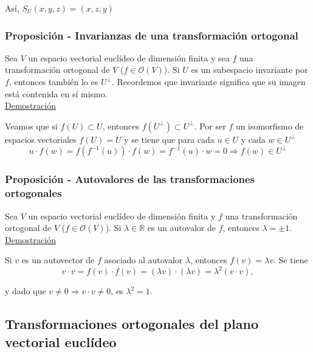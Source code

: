 \documentclass[12pt, a4paper, ones, notitlepage, openany,titlepage]{article}
\newcommand{\demostracion}{\noindent\underline{Demostración}}
\begin{document}
\noindent Así, $S_{U}(x, y, z)=(x, z, y)$

\subsubsection{Proposición - Invarianzas de una transformación ortogonal}
Sea $V$ un espacio vectorial euclídeo de dimensión finita y sea $f$ una transformación ortogonal de $V$ ($f \in \mathcal{O}(V)$). Si $U$ es un subespacio invariante por $f$, entonces también lo es $U^{\perp}$. Recordemos que invariante significa que su imagen está contenida en sí mismo.\\

\demostracion

Veamos que si $f(U) \subset U$, entonces $f\left(U^{\perp}\right) \subset U^{\perp}$. Por ser $f$ un isomorfismo de espacios vectoriales $f(U)=U$ y se tiene que para cada $u \in U$ y cada $w \in U^{\perp}$
$$
u \cdot f(w)=f\left(f^{-1}(u)\right) \cdot f(w)=f^{-1}(u) \cdot w=0 \Longrightarrow f(w) \in U^\perp
$$

\subsubsection{Proposición - Autovalores de las transformaciones ortogonales}
Sea $V$ un espacio vectorial euclídeo de dimensión finita y $f$ una transformación ortogonal de $V$ ($f \in \mathcal{O}(V)$). Si $\lambda \in \mathbb{R}$ es un autovalor de $f$, entonces $\lambda= \pm 1$.\\

\demostracion

Si $v$ es un autovector de $f$ asociado al autovalor $\lambda$, entonces $f(v)=\lambda v$. Se tiene
$$
v \cdot v=f(v) \cdot f(v)=(\lambda v) \cdot(\lambda v)=\lambda^{2} (v \cdot v),
$$

\noindent y dado que $v \neq 0 \Longrightarrow v \cdot v \neq 0$, es $\lambda^{2}=1$.

\subsection{Transformaciones ortogonales del plano vectorial euclídeo}
\end{document}
